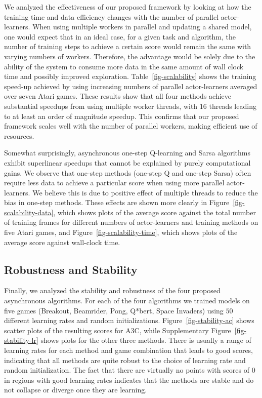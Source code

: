 \documentclass{article} \usepackage{times}
\begin{document}
We analyzed the effectiveness of our proposed framework by looking at how the training time and data efficiency changes with the number of parallel actor-learners.
When using multiple workers in parallel and updating a shared model, one would expect that in an ideal case, for a given task and algorithm, the number of training steps to achieve a certain score would remain the same with varying numbers of workers.
Therefore, the advantage would be solely due to the ability of the system to consume more data in the same amount of wall clock time and possibly improved exploration.
Table~\ref{fig-scalability} shows the training speed-up achieved by using increasing numbers of parallel actor-learners averaged over seven Atari games.
These results show that all four methods achieve substantial speedups from using multiple worker threads, with $16$ threads leading to at least an order of magnitude speedup.
This confirms that our proposed framework scales well with the number of parallel workers, making efficient use of resources.






Somewhat surprisingly, asynchronous one-step Q-learning and Sarsa algorithms exhibit superlinear speedups that cannot be explained by purely computational gains.
We observe that one-step methods (one-step Q and one-step Sarsa) often require less data to achieve a particular score when using more parallel actor-learners.
We believe this is due to positive effect of multiple threads to reduce the bias in one-step methods.
These effects are shown more clearly in Figure~\ref{fig-scalability-data}, which shows plots of the average score against the total number of training frames for different numbers of actor-learners and training methods on five Atari games, and Figure~\ref{fig-scalability-time}, which shows plots of the average score against wall-clock time.


\subsection{Robustness and Stability}
Finally, we analyzed the stability and robustness of the four proposed asynchronous algorithms.
For each of the four algorithms we trained models on five games (Breakout, Beamrider, Pong, Q*bert, Space Invaders) using $50$ different learning rates and random initializations.
Figure~\ref{fig-stability-ac} shows scatter plots of the resulting scores for A3C, while Supplementary Figure~\ref{fig-stability-lr} shows plots for the other three methods.
There is usually a range of learning rates for each method and game combination that leads to good scores, indicating that all methods are quite robust to the choice of learning rate and random initialization.
The fact that there are virtually no points with scores of $0$ in regions with good learning rates indicates that the methods are stable and do not collapse or diverge once they are learning.
\end{document}
